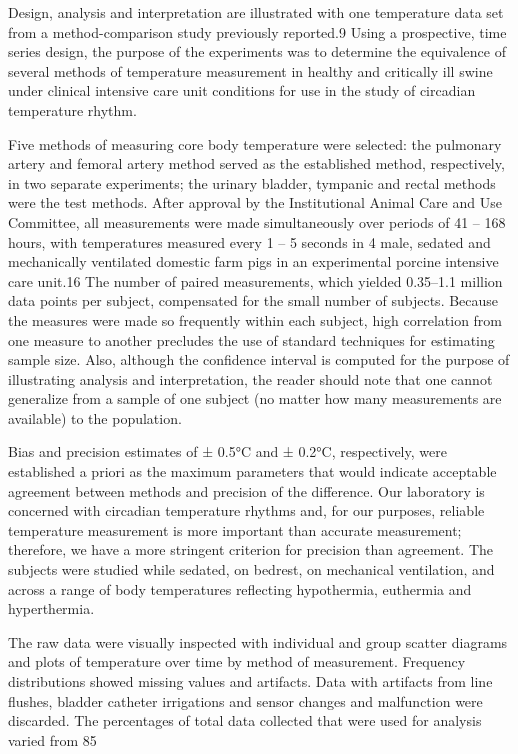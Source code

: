 \documentclass[]{article}
\begin{document}
Design, analysis and interpretation are illustrated with one temperature data set from a method-comparison study previously reported.9 Using a prospective, time series design, the purpose of the experiments was to determine the equivalence of several methods of temperature measurement in healthy and critically ill swine under clinical intensive care unit conditions for use in the study of circadian temperature rhythm.

Five methods of measuring core body temperature were selected: the pulmonary artery and femoral artery method served as the established method, respectively, in two separate experiments; the urinary bladder, tympanic and rectal methods were the test methods. After approval by the Institutional Animal Care and Use Committee, all measurements were made simultaneously over periods of 41 – 168 hours, with temperatures measured every 1 – 5 seconds in 4 male, sedated and mechanically ventilated domestic farm pigs in an experimental porcine intensive care unit.16 The number of paired measurements, which yielded 0.35–1.1 million data points per subject, compensated for the small number of subjects. Because the measures were made so frequently within each subject, high correlation from one measure to another precludes the use of standard techniques for estimating sample size. Also, although the confidence interval is computed for the purpose of illustrating analysis and interpretation, the reader should note that one cannot generalize from a sample of one subject (no matter how many measurements are available) to the population.

Bias and precision estimates of ± 0.5°C and ± 0.2°C, respectively, were established a priori as the maximum parameters that would indicate acceptable agreement between methods and precision of the difference. Our laboratory is concerned with circadian temperature rhythms and, for our purposes, reliable temperature measurement is more important than accurate measurement; therefore, we have a more stringent criterion for precision than agreement. The subjects were studied while sedated, on bedrest, on mechanical ventilation, and across a range of body temperatures reflecting hypothermia, euthermia and hyperthermia.

The raw data were visually inspected with individual and group scatter diagrams and plots of temperature over time by method of measurement. Frequency distributions showed missing values and artifacts. Data with artifacts from line flushes, bladder catheter irrigations and sensor changes and malfunction were discarded. The percentages of total data collected that were used for analysis varied from 85%
\end{document}
